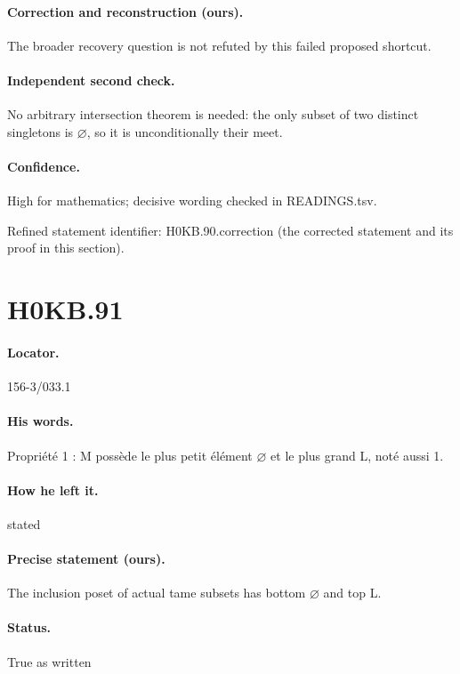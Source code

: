 \paragraph{Correction and reconstruction (ours).} The broader recovery question is not refuted by this failed proposed shortcut.

\paragraph{Independent second check.} No arbitrary intersection theorem is needed: the only subset of two distinct singletons is \ensuremath{\varnothing}, so it is unconditionally their meet.

\paragraph{Confidence.} High for mathematics; decisive wording checked in READINGS.tsv.

\noindent Refined statement identifier: H0KB.90.correction (the corrected statement and its proof in this section).

\section*{H0KB.91}\label{statement:H0KB.91}
\paragraph{Locator.} 156-3/033.1

\paragraph{His words.} Propriété 1 : M possède le plus petit élément \ensuremath{\varnothing} et le plus grand L, noté aussi 1.

\paragraph{How he left it.} stated

\paragraph{Precise statement (ours).} The inclusion poset of actual tame subsets has bottom \ensuremath{\varnothing} and top L.

\paragraph{Status.} True as written


